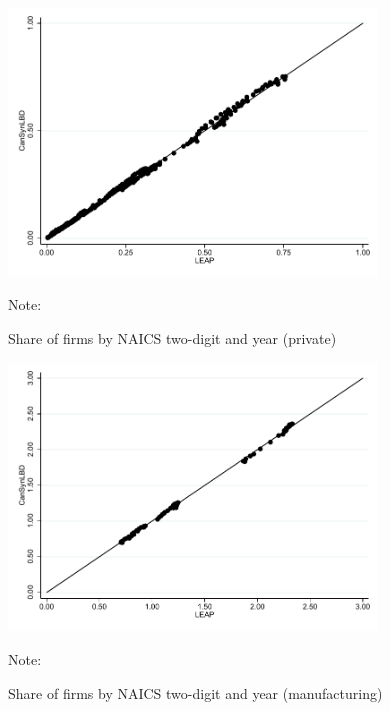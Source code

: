 \begin{figure} [H]
\centering
\caption{Share of firms by NAICS two-digit and year (private)} \label{FirmSharePrivate}
\includegraphics[height=2.8in, width=.7\linewidth]{graphs/Share_of_firms_by_NAICS_two-digit_and_year_private_bw.pdf} 
\begin{minipage}{0.85\textwidth}
{\footnotesize Note: \TableNote \par}
\end{minipage}
\end{figure}


\vspace{-15.5pt}
\begin{figure} [H]
\centering
\caption{Share of firms by NAICS two-digit and year (manufacturing)} \label{FirmShareManufacturing}
\includegraphics[height=2.8in, width=.7\linewidth]{graphs/Share_of_firms_by_NAICS_two-digit_and_year_Manufacturing_bw.pdf} 
\begin{minipage}{0.85\textwidth}
{\footnotesize Note: \TableNote \par}
\end{minipage}
\end{figure}


